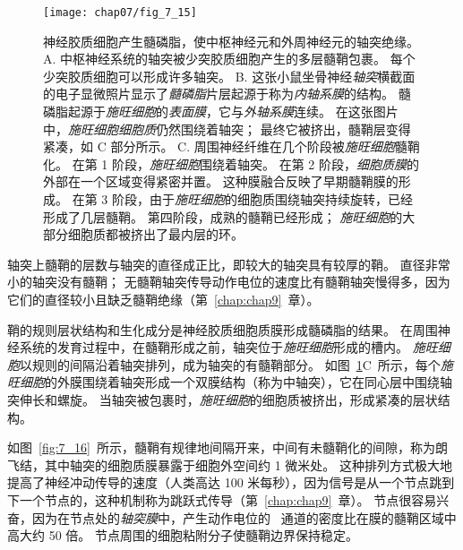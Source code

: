 \begin{figure}[htbp]
	\centering
	\texttt{[image: chap07/fig\_7\_15]}
	\caption{神经胶质细胞产生髓磷脂，使中枢神经元和外周神经元的轴突绝缘。
		A. 中枢神经系统的轴突被少突胶质细胞产生的多层髓鞘包裹。
		每个少突胶质细胞可以形成许多轴突\cite{raine1984morphology}。
		B. 这张小鼠坐骨神经\textit{轴突}横截面的电子显微照片显示了\textit{髓磷脂}片层起源于称为\textit{内轴系膜}的结构。
		髓磷脂起源于\textit{施旺细胞}的\textit{表面膜}，它与\textit{外轴系膜}连续。
		在这张图片中，\textit{施旺细胞细胞质}仍然围绕着轴突；
		最终它被挤出，髓鞘层变得紧凑，如 C 部分所示\cite{thomas1984clinical}。
		C. 周围神经纤维在几个阶段被\textit{施旺细胞}髓鞘化。
		在第 1 阶段，\textit{施旺细胞}围绕着轴突。
		在第 2 阶段，\textit{细胞质膜}的外部在一个区域变得紧密并置。
		这种膜融合反映了早期髓鞘膜的形成。
		在第 3 阶段，由于\textit{施旺细胞}的细胞质围绕轴突持续旋转，已经形成了几层髓鞘。
		第四阶段，成熟的髓鞘已经形成；
		\textit{施旺细胞}的大部分细胞质都被挤出了最内层的环\cite{williams1989bannister}。}
	\label{fig:7_15}
\end{figure}


轴突上髓鞘的层数与轴突的直径成正比，即较大的轴突具有较厚的鞘。
直径非常小的轴突没有髓鞘；
无髓鞘轴突传导动作电位的速度比有髓鞘轴突慢得多，因为它们的直径较小且缺乏髓鞘绝缘（第~\ref{chap:chap9}~章）。


鞘的规则层状结构和生化成分是神经胶质细胞质膜形成髓磷脂的结果。
在周围神经系统的发育过程中，在髓鞘形成之前，轴突位于\textit{施旺细胞}形成的槽内。
\textit{施旺细胞}以规则的间隔沿着轴突排列，成为轴突的有髓鞘部分。
如图~\ref{fig:7_15}C~所示，每个\textit{施旺细胞}的外膜围绕着轴突形成一个双膜结构（称为中轴突），它在同心层中围绕轴突伸长和螺旋。
当轴突被包裹时，\textit{施旺细胞}的细胞质被挤出，形成紧凑的层状结构。


如图~\ref{fig:7_16}~所示，髓鞘有规律地间隔开来，中间有未髓鞘化的间隙，称为朗飞结，其中轴突的细胞质膜暴露于细胞外空间约 1 微米处。
这种排列方式极大地提高了神经冲动传导的速度（人类高达 100 米每秒），因为信号是从一个节点跳到下一个节点的，这种机制称为跳跃式传导（第~\ref{chap:chap9}~章）。 
节点很容易兴奋，因为在节点处的\textit{轴突膜}中，产生动作电位的~ 通道的密度比在膜的髓鞘区域中高大约 50 倍。
节点周围的细胞粘附分子使髓鞘边界保持稳定。


